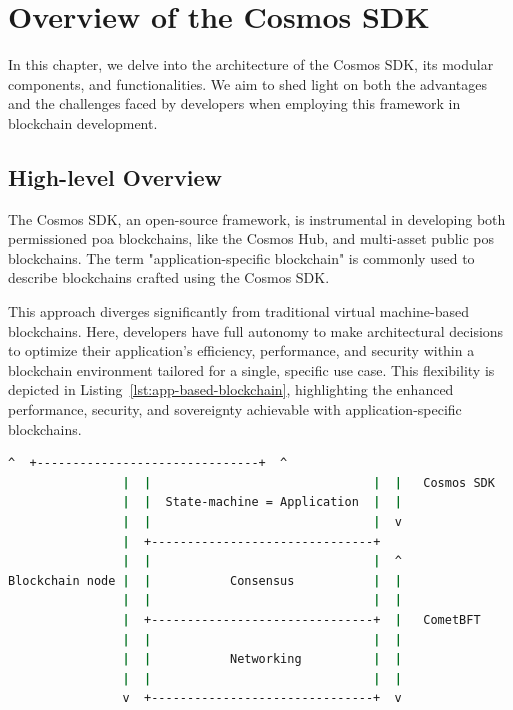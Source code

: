 \chapter{Overview of the Cosmos SDK}
\label{OCS:overview}

In this chapter, we delve into the architecture of the Cosmos SDK, its modular components, and functionalities. We aim to shed light on both the advantages and the challenges faced by developers when employing this framework in blockchain development.

\section{High-level Overview}

The Cosmos SDK, an open-source framework, is instrumental in developing both permissioned \gls{poa} blockchains, like the Cosmos Hub\cite{cosmos-hub}, and multi-asset public \gls{pos} blockchains. The term "application-specific blockchain" is commonly used to describe blockchains crafted using the Cosmos SDK.

This approach diverges significantly from traditional virtual machine-based blockchains. Here, developers have full autonomy to make architectural decisions to optimize their application’s efficiency, performance, and security within a blockchain environment tailored for a single, specific use case. This flexibility is depicted in Listing~\ref{lst:app-based-blockchain}, highlighting the enhanced performance, security, and sovereignty achievable with application-specific blockchains.

\newpage
\begin{lstlisting}[language=bash, caption=Application based blockchains. Source:\cite{app-based-blockchain},label={lst:app-based-blockchain}]
                ^  +-------------------------------+  ^
                |  |                               |  |   Cosmos SDK
                |  |  State-machine = Application  |  |
                |  |                               |  v
                |  +-------------------------------+
                |  |                               |  ^
Blockchain node |  |           Consensus           |  |
                |  |                               |  |
                |  +-------------------------------+  |   CometBFT
                |  |                               |  |
                |  |           Networking          |  |
                |  |                               |  |
                v  +-------------------------------+  v
\end{lstlisting}

